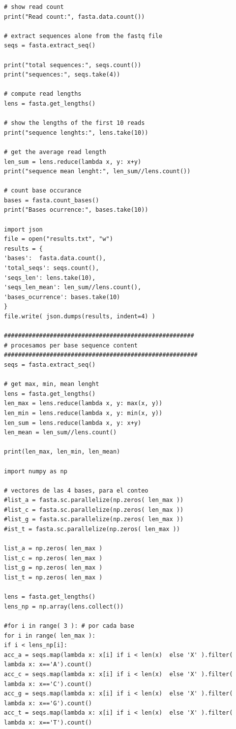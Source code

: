 \begin{lstlisting}
# show read count
print("Read count:", fasta.data.count())

# extract sequences alone from the fastq file
seqs = fasta.extract_seq()

print("total sequences:", seqs.count())
print("sequences:", seqs.take(4))

# compute read lengths
lens = fasta.get_lengths()

# show the lengths of the first 10 reads
print("sequence lenghts:", lens.take(10))

# get the average read length
len_sum = lens.reduce(lambda x, y: x+y)
print("sequence mean lenght:", len_sum//lens.count())

# count base occurance
bases = fasta.count_bases()
print("Bases ocurrence:", bases.take(10))

import json
file = open("results.txt", "w")
results = {
'bases':  fasta.data.count(),
'total_seqs': seqs.count(),  
'seqs_len': lens.take(10),
'seqs_len_mean': len_sum//lens.count(),
'bases_ocurrence': bases.take(10)
}
file.write( json.dumps(results, indent=4) )

######################################################
# procesamos per base sequence content
#######################################################
seqs = fasta.extract_seq()

# get max, min, mean lenght
lens = fasta.get_lengths()
len_max = lens.reduce(lambda x, y: max(x, y))
len_min = lens.reduce(lambda x, y: min(x, y))
len_sum = lens.reduce(lambda x, y: x+y)
len_mean = len_sum//lens.count()

print(len_max, len_min, len_mean)

import numpy as np

# vectores de las 4 bases, para el conteo
#list_a = fasta.sc.parallelize(np.zeros( len_max ))
#list_c = fasta.sc.parallelize(np.zeros( len_max ))
#list_g = fasta.sc.parallelize(np.zeros( len_max ))
#ist_t = fasta.sc.parallelize(np.zeros( len_max ))

list_a = np.zeros( len_max )
list_c = np.zeros( len_max )
list_g = np.zeros( len_max )
list_t = np.zeros( len_max )

lens = fasta.get_lengths()
lens_np = np.array(lens.collect())

#for i in range( 3 ): # por cada base 
for i in range( len_max ):
if i < lens_np[i]:
acc_a = seqs.map(lambda x: x[i] if i < len(x)  else 'X' ).filter( lambda x: x=='A').count()
acc_c = seqs.map(lambda x: x[i] if i < len(x)  else 'X' ).filter( lambda x: x=='C').count()
acc_g = seqs.map(lambda x: x[i] if i < len(x)  else 'X' ).filter( lambda x: x=='G').count()
acc_t = seqs.map(lambda x: x[i] if i < len(x)  else 'X' ).filter( lambda x: x=='T').count()


\end{lstlisting}

